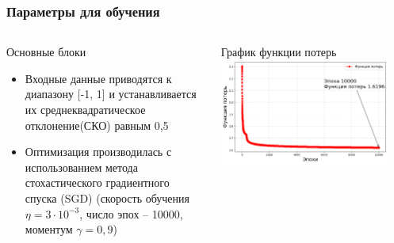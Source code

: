 \begin{frame}[t]
    \frametitle{Параметры для обучения}
    \begin{columns}[T]
    \begin{block}{\centering Основные блоки}                
        \begin{itemize}\small
            \item Входные данные приводятся к диапазону [-1, 1] и устанавливается их
            среднеквадратическое отклонение(СКО) равным 0,5
            \item Оптимизация производилась с использованием метода стохастического градиентного спуска (SGD)
            (скорость обучения $\eta =3 \cdot 10^{-3}$, число эпох -- 10000, моментум $\gamma = 0,9$)
        \end{itemize}
    \end{block}
     
    \begin{block}{\centering График функции потерь}
        \vspace{3mm}
        \centering \includegraphics[width = 0.9\textwidth]{pics/loss.png} 
    \end{block}
    \end{columns}
    
    \end{frame}
    